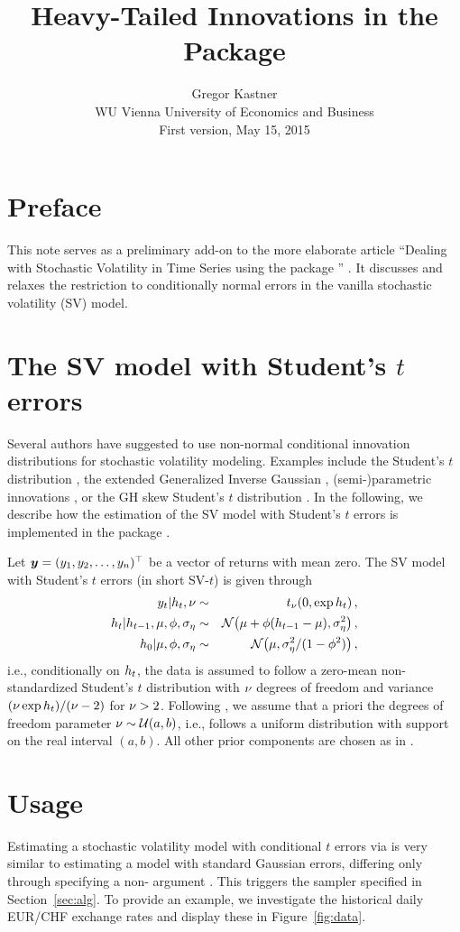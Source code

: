 \documentclass[article, nojss]{jss}
\author{Gregor Kastner\\WU Vienna University of Economics and Business\\[1em]First version, May 15, 2015}
\title{Heavy-Tailed Innovations in the \proglang{R} Package \pkg{stochvol}}
\begin{document}
\section*{Preface}
This note serves as a preliminary add-on to the more elaborate article ``Dealing with Stochastic Volatility in Time Series using the  package '' \citep{kas:dea}. It discusses and relaxes the restriction to conditionally normal errors in the vanilla stochastic volatility (SV) model.

\section{The SV model with Student's $t$ errors}

Several authors have suggested to use non-normal conditional innovation distributions for stochastic volatility modeling. Examples include the Student's $t$ distribution \citep{har-etal:mul}, the extended Generalized Inverse Gaussian \citep{sil-etal:ext}, (semi-)parametric innovations \citep{jen-mah:bay, del-gri:bay}, or the GH skew Student's $t$ distribution \citep{nak-omo:sto}. In the following, we describe how the estimation of the SV model with Student's $t$ errors is implemented in the  \citep{r:r} package  \citep{r:sto}.

Let $\bm{y} = (y_1, y_2, \dots, y_n)^\top$ be a vector of returns with mean zero. The SV model with Student's $t$ errors (in short SV-$t$) is given through
\begin{eqnarray}  
 \label{m1} y_{t}|\hsv_t,\df &\sim&  \Tdist{\df}{0,\exp \hsv_t}, \\
  \label{m2} \hsv_{t}|\hsv_{t-1},\mupar, \phipar, \sigmapar&\sim& \Normal{\mupar +  \phipar (\hsv_{t-1}- \mupar ),  \sigmapartwo},\\%
 \label{m3} \hsv_0|\mu,\phi,\sigmapar &\sim& \Normal{\mu,\sigmapartwo/(1-\phi^2)},
\end{eqnarray}
i.e., conditionally on $h_t$, the data is assumed to follow a zero-mean non-standardized Student's $t$ distribution with $\nu$ degrees of freedom and variance $(\nu \exp h_t)/(\nu-2)$ for $\nu > 2$. Following \cite{chi-etal:mar}, we assume that a priori the degrees of freedom parameter $\nu \sim \mathcal{U}\!\left(a,b\right)$, i.e., follows a uniform distribution with support on the real interval $(a,b)$. All other prior components are chosen as in \cite{kas:dea}.


\section{Usage}
Estimating a stochastic volatility model with conditional $t$ errors via  is very similar to estimating a model with standard Gaussian errors, differing only through specifying a non- argument . This triggers the sampler specified in Section~\ref{sec:alg}. To provide an example, we investigate the historical daily EUR/CHF exchange rates and display these in Figure~\ref{fig:data}.
\end{document}
